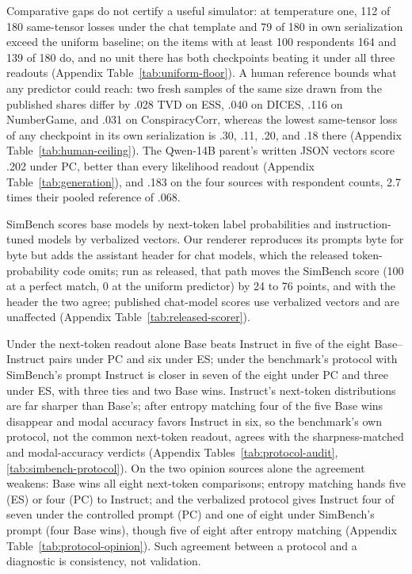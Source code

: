 \documentclass[11pt]{article}
\newcommand{\ES}{\textsc{ES}}
\newcommand{\PC}{\textsc{PC}}
\begin{document}
Comparative gaps do not certify a useful simulator: at temperature one, 112 of 180 same-tensor losses under the chat template and 79 of 180 in own serialization exceed the uniform baseline; on the items with at least 100 respondents 164 and 139 of 180 do, and no unit there has both checkpoints beating it under all three readouts (Appendix Table~\ref{tab:uniform-floor}). A human reference bounds what any predictor could reach: two fresh samples of the same size drawn from the published shares differ by .028 TVD on ESS, .040 on DICES, .116 on NumberGame, and .031 on ConspiracyCorr, whereas the lowest same-tensor loss of any checkpoint in its own serialization is .30, .11, .20, and .18 there (Appendix Table~\ref{tab:human-ceiling}). The Qwen-14B parent's written JSON vectors score .202 under \PC{}, better than every likelihood readout (Appendix Table~\ref{tab:generation}), and .183 on the four sources with respondent counts, 2.7 times their pooled reference of .068.

SimBench scores base models by next-token label probabilities and instruction-tuned models by verbalized vectors. Our renderer reproduces its prompts byte for byte but adds the assistant header for chat models, which the released token-probability code omits; run as released, that path moves the SimBench score (100 at a perfect match, 0 at the uniform predictor) by 24 to 76 points, and with the header the two agree; published chat-model scores use verbalized vectors and are unaffected (Appendix Table~\ref{tab:released-scorer}).

Under the next-token readout alone Base beats Instruct in five of the eight Base--Instruct pairs under \PC{} and six under \ES{}; under the benchmark's protocol with SimBench's prompt Instruct is closer in seven of the eight under \PC{} and three under \ES{}, with three ties and two Base wins. Instruct's next-token distributions are far sharper than Base's; after entropy matching four of the five Base wins disappear and modal accuracy favors Instruct in six, so the benchmark's own protocol, not the common next-token readout, agrees with the sharpness-matched and modal-accuracy verdicts (Appendix Tables~\ref{tab:protocol-audit}, \ref{tab:simbench-protocol}). On the two opinion sources alone the agreement weakens: Base wins all eight next-token comparisons; entropy matching hands five (\ES{}) or four (\PC{}) to Instruct; and the verbalized protocol gives Instruct four of seven under the controlled prompt (\PC{}) and one of eight under SimBench's prompt (four Base wins), though five of eight after entropy matching (Appendix Table~\ref{tab:protocol-opinion}). Such agreement between a protocol and a diagnostic is consistency, not validation.
\end{document}
